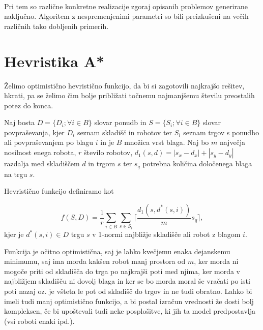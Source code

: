\documentclass[a4paper,12pt]{article} %
\begin{document}
\\
\vspace{2mm}

Pri tem so različne konkretne realizacije zgoraj opisanih problemov generirane naključno. Algoritem z nespremenjenimi parametri so bili preizkušeni na večih različnih tako dobljenih primerih.

\section{Hevristika A*}

Želimo optimistično hevristično funkcijo, da bi si zagotovili najkrajšo rešitev, hkrati, pa se želimo čim bolje približati točnemu najmanjšemu številu preostalih potez do konca.

Naj bosta $D = \lbrace D_i; \forall i\in B\rbrace$ slovar ponudb in $S = \lbrace S_i; \forall i\in B\rbrace$ slovar povpraševanja,
kjer $D_i$ seznam skladišč in robotov ter $S_i$ seznam trgov s  ponudbo ali povpraševanjem po blagu $i$ in je $B$ množica vrst blaga. Naj bo $m$ največja nosilnost enega robota, $r$ število robotov, $d_1(s,d) = |s_x-d_x|+|s_y-d_y|$ razdalja med skladiščem $d$ in trgom $s$ ter $s_q$ potrebna količina določenega blaga na trgu $s$.

Hevristično funkcijo definiramo kot

$$f(S,D) = \frac{1}{r}\sum_{i\in B}\sum_{s\in S_i}\lceil \frac{d_1(s,d^\ast(s,i))}{m} s_q\rceil,$$
kjer je $d^\ast(s,i)\in D$ trgu $s$ v 1-normi najbližje skladišče ali robot z blagom $i$.

Funkcija je očitno optimistična, saj je lahko kvečjemu enaka dejanskemu minimumu, saj ima morda kakšen robot manj prostora od $m$, ker morda ni mogoče priti od skladišča do trga po najkrajši poti med njima, ker morda v najbližjem skladišču ni dovolj blaga in ker se bo morda moral še vračati po isti poti nazaj oz. je všteta le pot od skladišč do trgov in ne tudi obratno. Lahko bi imeli tudi manj optimistično funkcijo, a bi postal izračun vrednosti že dosti bolj kompleksen, če bi upoštevali tudi neke posplošitve, ki jih ta model predpostavlja (vsi roboti enaki ipd.).
\end{document}

